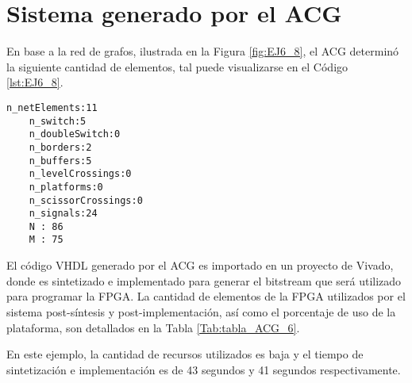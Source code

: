 \section{Sistema generado por el ACG}
	
	En base a la red de grafos, ilustrada en la Figura \ref{fig:EJ6_8}, el ACG determinó la siguiente cantidad de elementos, tal puede visualizarse en el Código \ref{lst:EJ6_8}.
	
	\begin{lstlisting}[language = {}, caption = Cantidad de elementos a implementar por el ACG, label = {lst:EJ6_8}]
	n_netElements:11
	n_switch:5
	n_doubleSwitch:0
	n_borders:2
	n_buffers:5
	n_levelCrossings:0
	n_platforms:0
	n_scissorCrossings:0
	n_signals:24
	N : 86
	M : 75
	\end{lstlisting}
	
	El código VHDL generado por el ACG es importado en un proyecto de Vivado, donde es sintetizado e implementado para generar el bitstream que será utilizado para programar la FPGA. La cantidad de elementos de la FPGA utilizados por el sistema post-síntesis y post-implementación, así como el porcentaje de uso de la plataforma, son detallados en la Tabla \ref{Tab:tabla_ACG_6}.
	
	\begin{table}[H]
		{
			\caption{Síntesis e implementación del ejemplo 6 generado por el ACG.}
			\label{Tab:tabla_ACG_6}
			\centering
			\begin{center}
			\end{center}
		}    
	\end{table}
	
	En este ejemplo, la cantidad de recursos utilizados es baja y el tiempo de sintetización e implementación es de 43 segundos y 41 segundos respectivamente.